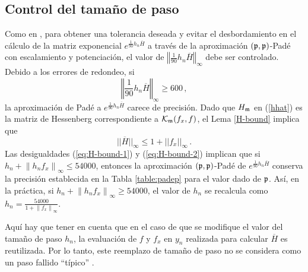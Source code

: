 \subsection{Control del tamaño de paso}\label{secc:hcontrol}
Como en \cite{Jimenez14AMC}, para obtener una tolerancia deseada y evitar el desbordamiento en el cálculo de la matriz exponencial $e^{\frac{1}{90}h_n\overline{H}}$ a través de la aproximación $(\mathfrak{p},\mathfrak{p})$-Padé con escalamiento y potenciación, el valor de $\left\Vert \frac{1}{90}h_n\overline{H} \right\Vert_\infty$ debe ser controlado. Debido a los errores de redondeo, si
\begin{equation}
	\left\Vert \frac{1}{90}h_n\overline{H} \right\Vert_\infty \ge 600\,,  \label{eq:H-bound-1}
\end{equation}
 la aproximación de Padé a $e^{\frac{1 }{90}h_n\overline{H}}$ carece de precisión. Dado que $H_{\mathfrak{m}}$ en (\ref{hhat}) es la matriz de Hessenberg correspondiente a $\mathcal{K}_{\mathfrak{m}}(f_x,f)$, el Lema \ref{H-bound} implica que
 \begin{equation}
 	|| \overline{H} ||_\infty \leq 1 + || f_x ||_\infty\,.  \label{eq:H-bound-2}
 \end{equation}
 Las desigualdades (\ref{eq:H-bound-1}) y (\ref{eq:H-bound-2}) implican que si $h_n + \left\lVert h_nf_x \right\rVert_\infty \leq 54000$, entonces la aproximación $(\mathfrak{p},\mathfrak{p})$-Padé de $e^{\frac{1}{90}h_n \overline{H}}$ conserva la precisión establecida en la Tabla \ref{table:padep} para el valor dado de $\mathfrak{p}$. Así, en la práctica, si $h_n + \left\lVert h_nf_x \right\rVert_\infty \ge 54000$, el valor de $h_n$ se recalcula como $h_n=\frac{54000}{1+\left\lVert f_x \right\rVert_\infty}$.

Aquí hay que tener en cuenta que en el caso de que se modifique el valor del tamaño de paso $h_{n}$, la evaluación de $f$ y $f_x$ en $y_n$ realizada para calcular $\overline{H}$ es reutilizada. Por lo tanto, este reemplazo de tamaño de paso no se considera como un paso fallido ``típico'' .

